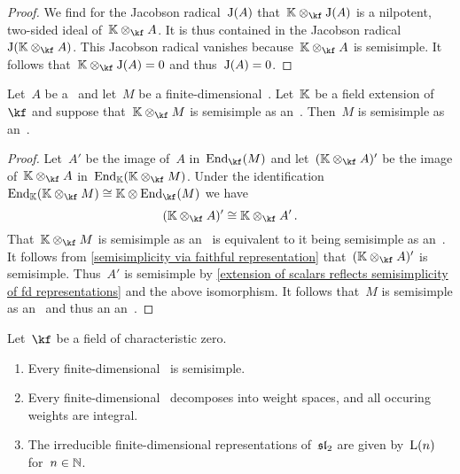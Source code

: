 \documentclass[a4paper, 11pt, oneside]{scrartcl}
\begin{document}
\begin{proof}
  We find for the Jacobson radical~$\operatorname{J}(A)$ that~$\Kf \tensor_{\kf} \Jac(A)$ is a nilpotent, two-sided ideal of~$\Kf \tensor_{\kf} A$.
  It is thus contained in the Jacobson radical~$\Jac(\Kf \tensor_{\kf} A)$.
  This Jacobson radical vanishes because~$\Kf \tensor_{\kf} A$ is semisimple.
  It follows that~$\Kf \tensor_{\kf} \Jac(A) = 0$ and thus~$\operatorname{J}(A) = 0$.
\end{proof}

\begin{corollary}
  \label{extension of scalars reflects semisimplicity of fd representations}
  Let~$A$ be a~\algebra{$\kf$} and let~$M$ be a finite-dimensional~.
  Let~$\mathbb{K}$ be a field extension of~$\kf$ and suppose that~$\Kf \tensor_{\kf} M$ is semisimple as an~.
  Then~$M$ is semisimple as an~.
\end{corollary}

\begin{proof}
  Let~$A'$ be the image of~$A$ in~$\End_{\kf}(M)$ and let~$(\Kf \tensor_{\kf} A)'$ be the image of~$\Kf \tensor_{\kf} A$ in~$\End_{\Kf}(\Kf \tensor_{\kf} M)$.
  Under the identification~$\End_{\Kf}(\Kf \tensor_{\kf} M) \cong \Kf \tensor \End_{\kf}(M)$ we have
  \[
    (\Kf \tensor_{\kf} A)'
    \cong
    \Kf \tensor_{\kf} A' \,.
  \]
  That~$\Kf \tensor_{\kf} M$ is semisimple as an~ is equivalent to it being semisimple as an~.
  It follows from \cref{semisimplicity via faithful representation} that~$(\Kf \tensor_{\kf} A)'$ is semisimple.
  Thus~$A'$ is semisimple by \cref{extension of scalars reflects semisimplicity of fd representations} and the above isomorphism.
  It follows that~$M$ is semisimple as an~ and thus an an~.
\end{proof}


\begin{theorem}
  Let~$\kf$ be a field of characteristic zero.
  \begin{enumerate}
    \item
      Every finite-dimensional~ is semisimple.
    \item
      Every finite-dimensional~ decomposes into weight spaces, and all occuring weights are integral.
    \item
      The irreducible finite-dimensional representations of~$\mathfrak{sl}_2$ are given by~$\operatorname{L}(n)$ for~$n \in \mathbb{N}$.
  \end{enumerate}
\end{theorem}
\end{document}
